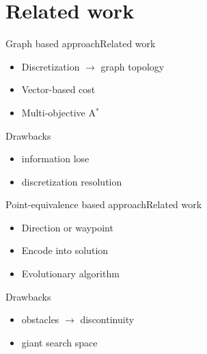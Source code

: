 \section{Related work}

\begin{frame}{Graph based approach}{Related work}
\begin{itemize}
\item Discretization $ \rightarrow $ graph topology
\item Vector-based cost
\item Multi-objective A$ ^{*}$
\end{itemize}
Drawbacks
\begin{itemize}
\item information lose
\item discretization resolution
\end{itemize}
\end{frame}

\begin{frame}{Point-equivalence based approach}{Related work}
\begin{itemize}
\item Direction or waypoint 
\item Encode into solution
\item Evolutionary algorithm
\end{itemize}
Drawbacks
\begin{itemize}
\item obstacles $ \rightarrow $ discontinuity
\item giant search space
\end{itemize}
\end{frame}

